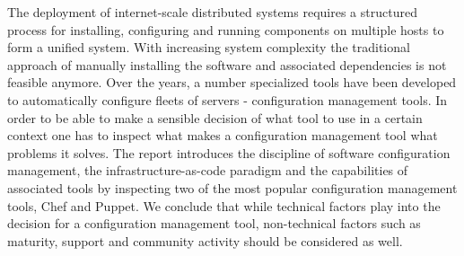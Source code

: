 The deployment of internet-scale distributed systems requires a structured process for installing, configuring and running components on multiple hosts to form a unified system. With increasing system complexity the traditional approach of manually installing the software and associated dependencies is not feasible anymore. Over the years, a number specialized tools have been developed to automatically configure fleets of servers - configuration management tools. In order to be able to make a sensible decision of what tool to use in a certain context one has to inspect what makes a configuration management tool what problems it solves. The report introduces the discipline of software configuration management, the infrastructure-as-code paradigm and the capabilities of associated tools by inspecting two of the most popular configuration management tools, Chef and Puppet. We conclude that while technical factors play into the decision for a configuration management tool, non-technical factors such as maturity, support and community activity should be considered as well.